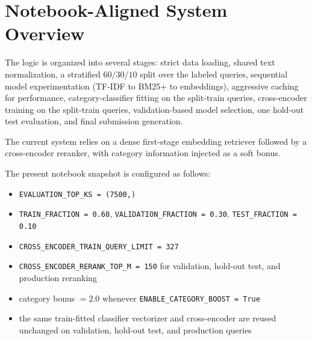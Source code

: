 \documentclass[11pt,a4paper]{article}
\begin{document}
\section{Notebook-Aligned System Overview}

The logic is organized into several stages: strict data loading, shared text normalization, a stratified \(60/30/10\) split over the labeled queries, sequential model experimentation (TF-IDF to BM25+ to embeddings), aggressive caching for performance, category-classifier fitting on the split-train queries, cross-encoder training on the split-train queries, validation-based model selection, one hold-out test evaluation, and final submission generation.

The current system relies on a dense first-stage embedding retriever followed by a cross-encoder reranker, with category information injected as a soft bonus.

The present notebook snapshot is configured as follows:
\begin{itemize}
    \item \texttt{EVALUATION\_TOP\_KS = (7500,)}
    \item \texttt{TRAIN\_FRACTION = 0.60}, \texttt{VALIDATION\_FRACTION = 0.30}, \texttt{TEST\_FRACTION = 0.10}
    \item \texttt{CROSS\_ENCODER\_TRAIN\_QUERY\_LIMIT = 327}
    \item \texttt{CROSS\_ENCODER\_RERANK\_TOP\_M = 150} for validation, hold-out test, and production reranking
    \item category bonus \(= 2.0\) whenever \texttt{ENABLE\_CATEGORY\_BOOST = True}
    \item the same train-fitted classifier vectorizer and cross-encoder are reused unchanged on validation, hold-out test, and production queries
\end{itemize}
\end{document}
